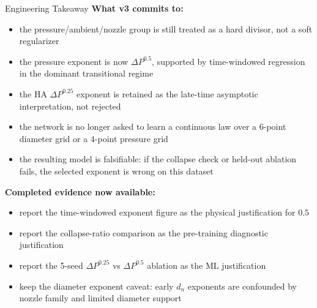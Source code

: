 \documentclass[UTF8,aspectratio=169]{ctexbeamer}
\begin{document}
\begin{frame}{Engineering Takeaway}
\footnotesize
\textbf{What v3 commits to:}
\begin{itemize}
\setlength{\itemsep}{0.12em}
  \item the pressure/ambient/nozzle group is still treated as a hard divisor, not a soft regularizer
  \item the pressure exponent is now \(\Delta P^{0.5}\), supported by time-windowed regression in the dominant transitional regime
  \item the HA \(\Delta P^{0.25}\) exponent is retained as the late-time asymptotic interpretation, not rejected
  \item the network is no longer asked to learn a continuous law over a $6$-point diameter grid or a $4$-point pressure grid
  \item the resulting model is falsifiable: if the collapse check or held-out ablation fails, the selected exponent is wrong on this dataset
\end{itemize}

\vspace{0.15em}
\textbf{Completed evidence now available:}
\begin{itemize}
\setlength{\itemsep}{0.12em}
  \item report the time-windowed exponent figure as the physical justification for \(0.5\)
  \item report the collapse-ratio comparison as the pre-training diagnostic justification
  \item report the 5-seed \(\Delta P^{0.25}\) vs \(\Delta P^{0.5}\) ablation as the ML justification
  \item keep the diameter exponent caveat: early \(d_n\) exponents are confounded by nozzle family and limited diameter support
\end{itemize}
\end{frame}
\end{document}
